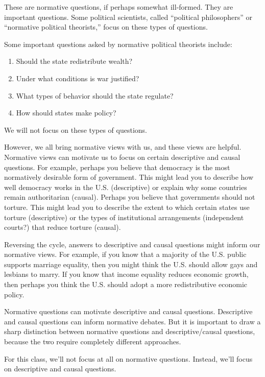 \documentclass[]{book}
\providecommand{\tightlist}{%
  \setlength{\itemsep}{0pt}\setlength{\parskip}{0pt}}
\theoremstyle{definition}
\theoremstyle{definition}
\theoremstyle{definition}
\theoremstyle{remark}
\begin{document}
These are normative questions, if perhaps somewhat ill-formed. They are
important questions. Some political scientists, called ``political
philosophers'' or ``normative political theorists,'' focus on these
types of questions.

Some important questions asked by normative political theorists include:

\begin{enumerate}
\def\labelenumi{\arabic{enumi}.}
\tightlist
\item
  Should the state redistribute wealth?
\item
  Under what conditions is war justified?
\item
  What types of behavior should the state regulate?
\item
  How should states make policy?
\end{enumerate}

We will not focus on these types of questions.

However, we all bring normative views with us, and these views are
helpful. Normative views can motivate us to focus on certain descriptive
and causal questions. For example, perhaps you believe that democracy is
the most normatively desirable form of government. This might lead you
to describe how well democracy works in the U.S. (descriptive) or
explain why some countries remain authoritarian (causal). Perhaps you
believe that governments should not torture. This might lead you to
describe the extent to which certain states use torture (descriptive) or
the types of institutional arrangements (independent courts?) that
reduce torture (causal).

Reversing the cycle, answers to descriptive and causal questions might
inform our normative views. For example, if you know that a majority of
the U.S. public supports marriage equality, then you might think the
U.S. should allow gays and lesbians to marry. If you know that income
equality reduces economic growth, then perhaps you think the U.S. should
adopt a more redistributive economic policy.

Normative questions can motivate descriptive and causal questions.
Descriptive and causal questions can inform normative debates. But it is
important to draw a sharp distinction between normative questions and
descriptive/causal questions, because the two require completely
different approaches.

For this class, we'll not focus at all on normative questions. Instead,
we'll focus on descriptive and causal questions.
\end{document}
